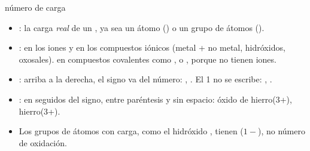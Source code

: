 \documentclass[12pt]{article}
\theoremstyle{mygreennumbox}
\newcommand{\etiquetanom}[2]{\tcbox[on line, colback=#1!10, colframe=#1, boxrule=0.5pt, arc=2pt, boxsep=0pt, left=2pt, right=2pt, top=0.5pt, bottom=0.5pt]{\scriptsize\sffamily\bfseries\textcolor{#1}{#2}}}
\newcommand{\concarga}{\etiquetanom{myOrange3}{nº de carga}}
\begin{document}
\begin{definicion}{número de carga \concarga}
    \begin{itemize}
        \item {}: la carga \emph{real} de un , ya sea un átomo () o un grupo de átomos ().
        \item {}:  en los iones y en los compuestos iónicos (metal + no metal, hidróxidos, oxosales).  en compuestos covalentes como ,  o , porque no tienen iones.
        \item {}: arriba a la derecha, el signo va  del número: , . El 1 no se escribe: , .
        \item {}: en  seguidos del signo, entre paréntesis y sin espacio: óxido de hierro(3+), hierro(3+).
        \item Los grupos de átomos con carga, como el hidróxido , tienen  (\(1-\)), no número de oxidación.
    \end{itemize}
\end{definicion}
\end{document}

